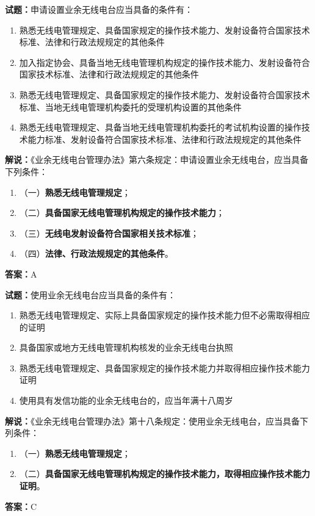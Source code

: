 \documentclass{ctexbook}
\begin{document}
\noindent\textbf{试题：}申请设置业余无线电台应当具备的条件有：
\begin{enumerate}[leftmargin=3em]
  \item 熟悉无线电管理规定、具备国家规定的操作技术能力、发射设备符合国家技术标准、法律和行政法规规定的其他条件
  \item 加入指定协会、具备当地无线电管理机构规定的操作技术能力、发射设备符合国家技术标准、法律和行政法规规定的其他条件
  \item 熟悉无线电管理规定、具备国家规定的操作技术能力、发射设备符合国家技术标准、当地无线电管理机构委托的受理机构设置的其他条件
  \item 熟悉无线电管理规定、具备当地无线电管理机构委托的考试机构设置的操作技术能力标准、发射设备符合国家技术标准、法律和行政法规规定的其他条件
\end{enumerate}
\noindent\textbf{解说：}《业余无线电台管理办法》第六条规定：申请设置业余无线电台，应当具备下列条件：
\begin{enumerate}[label=, leftmargin=1em]
  \item （一）\textbf{熟悉无线电管理规定}；
  \item （二）\textbf{具备国家无线电管理机构规定的操作技术能力}；
  \item （三）\textbf{无线电发射设备符合国家相关技术标准}；
  \item （四）\textbf{法律、行政法规规定的其他条件}。
\end{enumerate}
\noindent\textbf{答案：}A

\vspace{\baselineskip}

\noindent\textbf{试题：}使用业余无线电台应当具备的条件有：
\begin{enumerate}[leftmargin=3em]
  \item 熟悉无线电管理规定、实际上具备国家规定的操作技术能力但不必需取得相应的证明
  \item 具备国家或地方无线电管理机构核发的业余无线电台执照
  \item 熟悉无线电管理规定、具备国家规定的操作技术能力并取得相应操作技术能力证明
  \item 使用具有发信功能的业余无线电台的，应当年满十八周岁
\end{enumerate}
\noindent\textbf{解说：}《业余无线电台管理办法》第十八条规定：使用业余无线电台，应当具备下列条件：
\begin{enumerate}[label=, leftmargin=1em]
  \item（一）\textbf{熟悉无线电管理规定}；
  \item（二）\textbf{具备国家无线电管理机构规定的操作技术能力，取得相应操作技术能力证明}。
\end{enumerate}
\noindent\textbf{答案：}C
\end{document}
